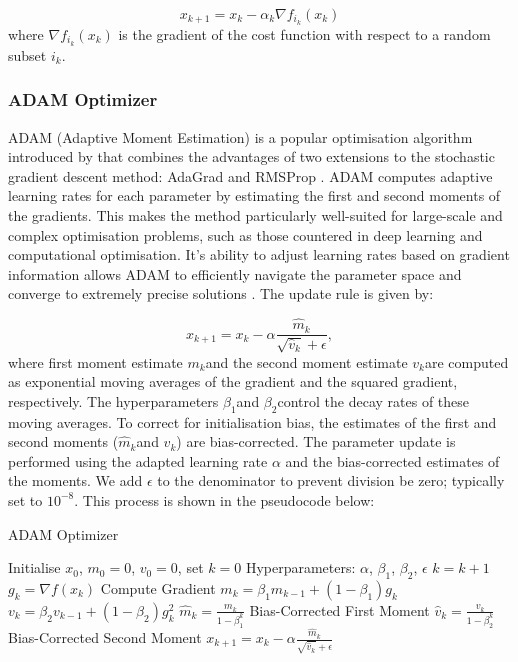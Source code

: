\documentclass[a4paper]{report}
\begin{document}
\begin{equation}\label{SGD}
x_{k+1} = x_k - \alpha_k \nabla f_{i_k}(x_k)	
\end{equation}
where $\nabla f_{i_k}(x_k)$ is the gradient of the cost function with respect to a random subset $i_k$.

\subsubsection{ADAM Optimizer}\label{section:ADAM}
ADAM (Adaptive Moment Estimation) is a popular optimisation algorithm introduced by \citet{kingma2014adam} that combines the advantages of two extensions to the stochastic gradient descent method: AdaGrad \citep{duchi2011adaptive} and RMSProp \citep{tieleman2012rmsprop}. ADAM computes adaptive learning rates for each parameter by estimating the first and second moments of the gradients. This makes the method particularly well-suited for large-scale and complex optimisation problems, such as those countered in deep learning and computational optimisation. It's ability to adjust learning rates based on gradient information allows ADAM to efficiently navigate the parameter space and converge to extremely precise solutions \citep{reddi2019convergence}. The update rule is given by:

\begin{equation}
x_{k+1} = x_{k} - \alpha \frac{\hat{m}_{k}}{\sqrt{\hat{v}_{k}} + \epsilon},
\end{equation}
where first moment estimate $m_k$​ and the second moment estimate $v_k$​ are computed as exponential moving averages of the gradient and the squared gradient, respectively. The hyperparameters $\beta_1$​ and $\beta_2$​ control the decay rates of these moving averages. To correct for initialisation bias, the estimates of the first and second moments ($\hat{m}_k$and $\hat{v}_k$) are bias-corrected. The parameter update is performed using the adapted learning rate $\alpha$ and the bias-corrected estimates of the moments. We add $\epsilon$ to the denominator to prevent division be zero; typically set to $10^{-8}$. This process is shown in the pseudocode below:

\begin{algorithm}[H]
\caption{ADAM Optimizer}
\label{algo:ADAM}
\begin{algorithmic}[1]
\State Initialise \( x_0 \), \( m_0 = 0 \), \( v_0 = 0 \), set \( k = 0 \)
\State Hyperparameters: \( \alpha \), \( \beta_1 \), \( \beta_2 \), \( \epsilon \)
    \State \( k = k + 1 \)
    \State \( g_k = \nabla f(x_k) \) \Comment Compute Gradient
    \State \( m_k = \beta_1 m_{k-1} + (1 - \beta_1) g_k \)
    \State \( v_k = \beta_2 v_{k-1} + (1 - \beta_2) g_k^2 \)
    \State \( \hat{m}_k = \frac{m_k}{1 - \beta_1^k} \) \Comment Bias-Corrected First Moment
    \State  \( \hat{v}_k = \frac{v_k}{1 - \beta_2^k} \) \Comment Bias-Corrected Second Moment
    \State \( x_{k+1} = x_k - \alpha \frac{\hat{m}_k}{\sqrt{\hat{v}_k} + \epsilon} \)
\EndWhile
\end{algorithmic}
\end{algorithm}
\end{document}
